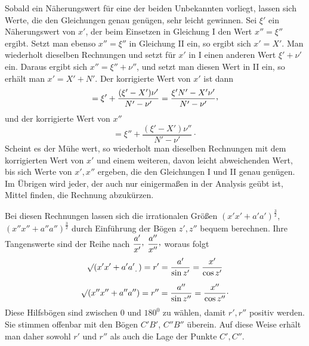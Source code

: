 Sobald ein Näherungswert für eine der beiden Unbekannten vorliegt, lassen sich Werte, die den Gleichungen genau genügen, sehr leicht gewinnen. Sei $\xi'$ ein Näherungswert von $x'$, der beim Einsetzen in Gleichung I den Wert $x''=\xi''$ ergibt. Setzt man ebenso $x''=\xi''$ in Gleichung II ein, so ergibt sich $x'=X'$. Man wiederholt dieselben Rechnungen und setzt für $x'$ in I einen anderen Wert $\xi'+\nu'$ ein. Daraus ergibt sich $x''=\xi''+\nu''$, und setzt man diesen Wert in II ein, so erhält man $x'=X'+N'$. Der korrigierte Wert von $x'$ ist dann
\[
=\xi'+\frac{(\xi'-X')\nu'}{N'-\nu'}=\frac{\xi'N'-X'\nu'}{N'-\nu'}\mathpunct{\raisebox{.45ex}{,}}
\]
und der korrigierte Wert von $x''$
\[
=\xi''+\frac{(\xi'-X')\nu''}{N'-\nu'}\mathpunct{\cdot}
\]
Scheint es der Mühe wert, so wiederholt man dieselben Rechnungen mit dem korrigierten Wert von $x'$ und einem weiteren, davon leicht abweichenden Wert, bis sich Werte von $x',x''$ ergeben, die den Gleichungen I und II genau genügen. Im Übrigen wird jeder, der auch nur einigermaßen in der Analysis geübt ist, Mittel finden, die Rechnung abzukürzen.

Bei diesen Rechnungen lassen sich die irrationalen Größen $(x'x'+a'a')^{\frac32}$, $(x''x''+a''a'')^{\frac32}$ durch Einführung der Bögen $z',z''$ bequem berechnen. Ihre Tangenswerte sind der Reihe nach $\dfrac{a'}{x'}\mathpunct{\raisebox{.45ex}{,}}$ $\dfrac{a''}{x''}\mathpunct{\raisebox{.45ex}{,}}$ woraus folgt
\[
\begin{gathered}
\surd(x'x'+a'a'\mathpunct{\raisebox{-.5ex}{.}})=r'=\frac{a'}{\sin z'}=\frac{x'}{\cos z'}\\[.6em]
\surd(x''x''+a''a'')=r''=\frac{a''}{\sin z''}=\frac{x''}{\cos z''}\mathpunct{\cdot}
\end{gathered}
\]
Diese Hilfsbögen sind zwischen $0$ und $180^0$ zu wählen, damit $r',r''$ positiv werden. Sie stimmen offenbar mit den Bögen $C'B'$, $C''B''$ überein. Auf diese Weise erhält man daher sowohl $r'$ und $r''$ als auch die Lage der Punkte $C',C''$.

